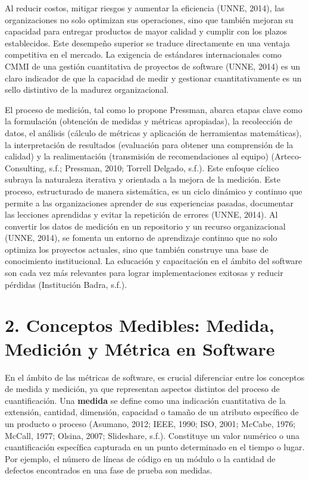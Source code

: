 \documentclass[11pt]{article}
\begin{document}
Al reducir costos, mitigar riesgos y aumentar la eficiencia (UNNE, 2014), las organizaciones no solo optimizan sus operaciones, sino que también mejoran su capacidad para entregar productos de mayor calidad y cumplir con los plazos establecidos. Este desempeño superior se traduce directamente en una ventaja competitiva en el mercado. La exigencia de estándares internacionales como CMMI de una gestión cuantitativa de proyectos de software (UNNE, 2014) es un claro indicador de que la capacidad de medir y gestionar cuantitativamente es un sello distintivo de la madurez organizacional.

El proceso de medición, tal como lo propone Pressman, abarca etapas clave como la formulación (obtención de medidas y métricas apropiadas), la recolección de datos, el análisis (cálculo de métricas y aplicación de herramientas matemáticas), la interpretación de resultados (evaluación para obtener una comprensión de la calidad) y la realimentación (transmisión de recomendaciones al equipo) (Arteco-Consulting, s.f.; Pressman, 2010; Torrell Delgado, s.f.). Este enfoque cíclico subraya la naturaleza iterativa y orientada a la mejora de la medición. Este proceso, estructurado de manera sistemática, es un ciclo dinámico y continuo que permite a las organizaciones aprender de sus experiencias pasadas, documentar las lecciones aprendidas y evitar la repetición de errores (UNNE, 2014). Al convertir los datos de medición en un repositorio y un recurso organizacional (UNNE, 2014), se fomenta un entorno de aprendizaje continuo que no solo optimiza los proyectos actuales, sino que también construye una base de conocimiento institucional. La educación y capacitación en el ámbito del software son cada vez más relevantes para lograr implementaciones exitosas y reducir pérdidas (Institución Badra, s.f.).

\section{2. Conceptos Medibles: Medida, Medición y Métrica en Software}

En el ámbito de las métricas de software, es crucial diferenciar entre los conceptos de medida y medición, ya que representan aspectos distintos del proceso de cuantificación. Una \textbf{medida} se define como una indicación cuantitativa de la extensión, cantidad, dimensión, capacidad o tamaño de un atributo específico de un producto o proceso (Asumano, 2012; IEEE, 1990; ISO, 2001; McCabe, 1976; McCall, 1977; Olsina, 2007; Slideshare, s.f.). Constituye un valor numérico o una cuantificación específica capturada en un punto determinado en el tiempo o lugar. Por ejemplo, el número de líneas de código en un módulo o la cantidad de defectos encontrados en una fase de prueba son medidas.
\end{document}
